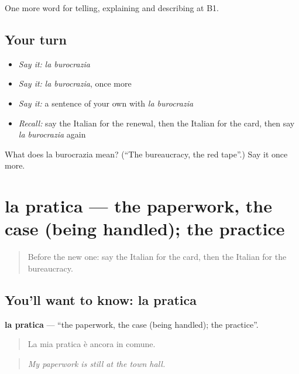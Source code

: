 \begin{grammarlens}[title={What you've built}]
One more word for telling, explaining and describing at B1.
\end{grammarlens}

\subsection*{Your turn}
\begin{itemize}
\raggedright
  \item \emph{Say it:} \emph{la burocrazia}
  \item \emph{Say it:} \emph{la burocrazia}, once more
  \item \emph{Say it:} a sentence of your own with \emph{la burocrazia}
  \item \emph{Recall:} say the Italian for the renewal, then the Italian for the card, then say \emph{la burocrazia} again
\end{itemize}

\begin{tcolorbox}[breakable,colback=teal!4,colframe=teal!35!black,title={Before you move on}]
What does la burocrazia mean? (\textquotedblleft{}The bureaucracy, the red tape\textquotedblright{}.) Say it once more.
\end{tcolorbox}
\section[la pratica]{la pratica — the paperwork, the case (being handled); the practice}

\label{lesson:IT-C389-pratica}



\begin{quote}
Before the new one: say the Italian for the card, then the Italian for the bureaucracy.
\end{quote}

\subsection*{You'll want to know: la pratica}
\textbf{la pratica} — \textquotedblleft{}the paperwork, the case (being handled); the practice\textquotedblright{}.

\begin{quote}
La mia pratica è ancora in comune.
\end{quote}

\begin{quote}
\emph{My paperwork is still at the town hall.}
\end{quote}

